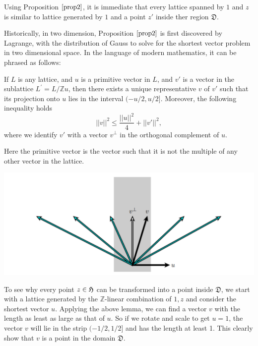 Using Proposition $\ref{prop2}$, it is immediate that every lattice spanned by $1$ and $z$
is similar to lattice generated by $1$ and a point $z'$ inside ther region $\mathfrak{D}$.

Historically, in two dimension, Proposition $\ref{prop2}$ is first discovered by Lagrange, with the distribution
of Gauss to solve for the shortest vector problem in two dimensional space. In the language of modern mathematics,
it can be phrased as follows:
\begin{prop}
  If $L$ is any lattice, and $u$ is a primitive vector in $L$, and $v'$ is a vector in the sublattice
  $L^\prime = L/\mathbb{Z}u$, then there exists a unique representative $v$ of $v'$ such that its projection onto $u$ lies in the interval
  $(-u/2,u/2]$. Moreover, the following inequality holds
  \[||v||^2 \le \dfrac{||u||^2}{4}+||v'||^2,\]
  where we identify $v'$ with a vector $v^\perp$ in the orthogonal complement of $u$.
\end{prop}
\begin{remark}
  Here the primitive vector is the vector such that it is not the multiple of any other vector in the lattice.
\end{remark}
\includegraphics{Shortest vector.png}

To see why every point $z \in \operatorname{\mathfrak{H}}$ can be transformed into a point inside $\mathfrak{D}$,
we start with a lattice generated by the $\mathbb{Z}$-linear combination of $1,z$ and
consider the shortest vector $u$. Applying the above lemma, we can find a vector $v$ with the length as least
as large as that of $u$. So if we rotate and scale to get $u=1$, the vector $v$ will lie
in the strip $(-1/2,1/2]$ and has the length at least 1. This clearly show that $v$ is a point in the domain
$\mathfrak{D}$.


